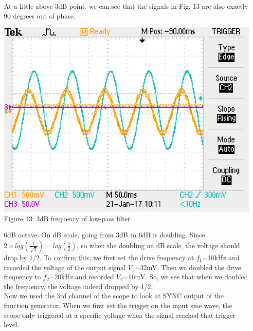 \documentclass[]{article}
\begin{document}
	At a little above 3dB point, we can see that the signals in Fig. 13 are also exactly 90 degrees out of phase.
		\begin{center}
			\includegraphics[scale=0.7]{e_3db}\\
		Figure 13: 3dB frequency of low-pass filter
	\end{center}
	6dB octave: On dB scale, going from 3dB to 6dB is doubling. Since $2 \times log(\frac{1}{\sqrt{2}}) = log(\frac{1}{2})$, so when the doubling on dB scale, the voltage should drop by 1/2. To confirm this, we first set the drive frequency at $f_{1}$=10kHz and recorded the voltage of the output signal $V_{1}$=32mV. Then we doubled the drive frequency to $f_{2}$=20kHz and recorded $V_{2}$=16mV. So, we see that when we doubled the frequency, the voltage indeed dropped by 1/2.\\
	
	Now we used the 3rd channel of the scope to look at SYNC output of the function generator. When we first set the trigger on the input sine wave, the scope only triggered at a specific voltage when the signal reached that trigger level. \\
\end{document}
